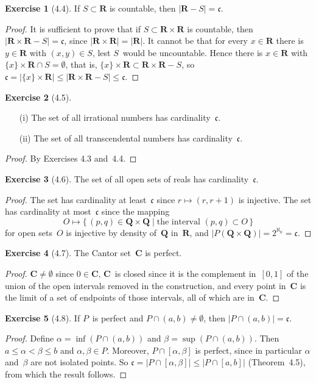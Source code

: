 \documentclass[letterpaper,12pt]{article}
\newcommand{\Q}{\boldsymbol{Q}}
\newcommand{\R}{\boldsymbol{R}}
\newcommand{\C}{\boldsymbol{C}}
\renewcommand{\P}{P}
\newcommand{\cc}{\mathfrak{c}}
\newcommand{\sect}{\cap}
\newcommand{\card}[1]{|#1|}
\theoremstyle{definition}
\newtheorem*{exer}{Exercise}
\theoremstyle{remark}
\begin{document}
\begin{exer}[4.4]
If \(S\subset\R\) is countable, then \(\card{\R-S}=\cc\).
\end{exer}
\begin{proof}
It is sufficient to prove that if \(S\subset\R\times\R\) is countable, then \(\card{\R\times\R-S}=\cc\), since \(\card{\R\times\R}=\card{\R}\). It cannot be that for every \(x\in\R\) there is \(y\in\R\) with \((x,y)\in S\), lest \(S\)~would be uncountable. Hence there is \(x\in\R\) with \(\{x\}\times\R\sect S=\emptyset\), that is, \(\{x\}\times\R\subset\R\times\R-S\), so \(\cc=\card{\{x\}\times\R}\le\card{\R\times\R-S}\le\cc\).
\end{proof}

\begin{exer}[4.5]\
\begin{enumerate}[itemsep=0pt]
\item[(i)] The set of all irrational numbers has cardinality~\(\cc\).
\item[(ii)] The set of all transcendental numbers has cardinality~\(\cc\).
\end{enumerate}
\end{exer}
\begin{proof}
By Exercises 4.3 and~4.4.
\end{proof}

\begin{exer}[4.6]
The set of all open sets of reals has cardinality~\(\cc\).
\end{exer}
\begin{proof}
The set has cardinality at least~\(\cc\) since \(r\mapsto(r,r+1)\) is injective. The set has cardinality at most~\(\cc\) since the mapping
\[O\mapsto\{\,(p,q)\in\Q\times\Q\mid\text{the interval }(p,q)\subset O\,\}\]
for open sets~\(O\) is injective by density of~\(\Q\) in~\(\R\), and \(\card{\P(\Q\times\Q)}=2^{\aleph_0}=\cc\).
\end{proof}

\begin{exer}[4.7]
The Cantor set~\(\C\) is perfect.
\end{exer}
\begin{proof}
\(\C\ne\emptyset\) since \(0\in\C\), \(\C\)~is closed since it is the complement in~\([0,1]\) of the union of the open intervals removed in the construction, and every point in~\(\C\) is the limit of a set of endpoints of those intervals, all of which are in~\(\C\).
\end{proof}

\begin{exer}[4.8]
If \(P\)~is perfect and \(P\sect(a,b)\ne\emptyset\), then \(\card{P\sect(a,b)}=\cc\).
\end{exer}
\begin{proof}
Define \(\alpha=\inf(P\sect(a,b))\) and \(\beta=\sup(P\sect(a,b))\). Then \(a\le\alpha<\beta\le b\) and \(\alpha,\beta\in P\). Moreover, \(P\sect[\alpha,\beta]\) is perfect, since in particular \(\alpha\) and~\(\beta\) are not isolated points. So \(\cc=\card{P\sect[\alpha,\beta]}\le\card{P\sect[a,b]}\) (Theorem~4.5), from which the result follows.
\end{proof}
\end{document}
